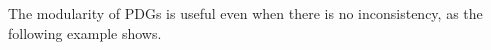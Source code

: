 \documentclass{article}
\newcommand{\commentout}[1]{\ignorespaces}
\newcommand{\MN}{PDG}
\newcommand{\MNs}{\MN s}
\numberwithin{equation}{section}
\begin{document}
\begin{notfocus}
The modularity of PDGs is useful even when there is no
inconsistency, as the following example shows. 
\commentout{The modularity of PDGs is useful even when there is no inconsistency, as the following example shows. } 


\end{notfocus}
\end{document}
